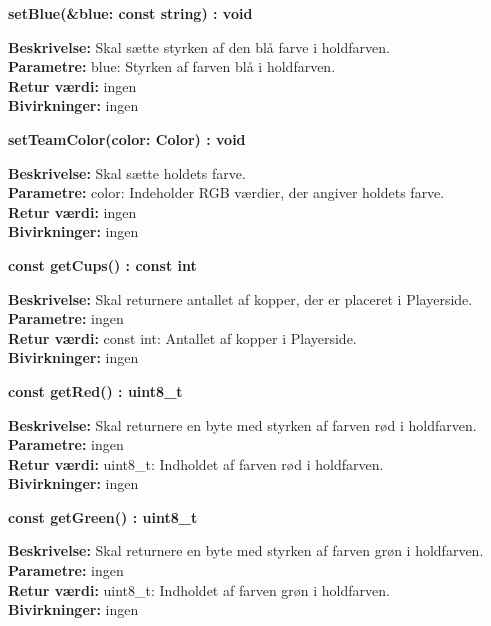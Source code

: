 \documentclass[Arkitektur/System_main.tex]{subfiles}
\begin{document}
\textbf{setBlue(\&blue: const string) : void}
\begin{adjustwidth}{1cm}{0pt}
\textbf{Beskrivelse:} Skal sætte styrken af den blå farve i holdfarven.\\
\textbf{Parametre:} blue: Styrken af farven blå i holdfarven. \\[0.2cm]
\textbf{Retur værdi:} ingen \\[0.2cm]
\textbf{Bivirkninger:} ingen \\[0.2cm]
\end{adjustwidth}

\textbf{setTeamColor(color: Color) : void}
\begin{adjustwidth}{1cm}{0pt}
\textbf{Beskrivelse:} Skal sætte holdets farve.\\
\textbf{Parametre:} color: Indeholder RGB værdier, der angiver holdets farve. \\[0.2cm]
\textbf{Retur værdi:} ingen \\[0.2cm]
\textbf{Bivirkninger:} ingen \\[0.2cm]
\end{adjustwidth}

\textbf{const getCups() : const int}
\begin{adjustwidth}{1cm}{0pt}
\textbf{Beskrivelse:} Skal returnere antallet af kopper, der er placeret i Playerside.\\
\textbf{Parametre:} ingen \\[0.2cm]
\textbf{Retur værdi:} const int: Antallet af kopper i Playerside.\\[0.2cm]
\textbf{Bivirkninger:} ingen \\[0.2cm]
\end{adjustwidth}

\textbf{const getRed() : uint8\_t}
\begin{adjustwidth}{1cm}{0pt}
\textbf{Beskrivelse:} Skal returnere en byte med styrken af farven rød i holdfarven.\\
\textbf{Parametre:} ingen \\[0.2cm]
\textbf{Retur værdi:} uint8\_t: Indholdet af farven rød i holdfarven.\\[0.2cm]
\textbf{Bivirkninger:} ingen \\[0.2cm]
\end{adjustwidth}

\textbf{const getGreen() : uint8\_t}
\begin{adjustwidth}{1cm}{0pt}
\textbf{Beskrivelse:} Skal returnere en byte med styrken af farven grøn i holdfarven.\\
\textbf{Parametre:} ingen \\[0.2cm]
\textbf{Retur værdi:} uint8\_t: Indholdet af farven grøn i holdfarven.\\[0.2cm]
\textbf{Bivirkninger:} ingen \\[0.2cm]
\end{adjustwidth}
\end{document}
